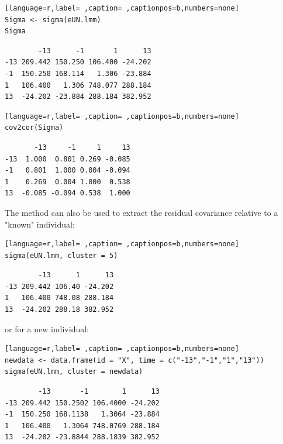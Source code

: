 \documentclass[12pt]{article}
\begin{document}
\medskip

\begin{minipage}{0.45\linewidth}
\begin{lstlisting}[language=r,label= ,caption= ,captionpos=b,numbers=none]
Sigma <- sigma(eUN.lmm)
Sigma
\end{lstlisting}

\begin{verbatim}
        -13      -1       1      13
-13 209.442 150.250 106.400 -24.202
-1  150.250 168.114   1.306 -23.884
1   106.400   1.306 748.077 288.184
13  -24.202 -23.884 288.184 382.952
\end{verbatim}

\end{minipage}
\begin{minipage}{0.05\linewidth}
\hphantom{x}
\end{minipage}
\begin{minipage}{0.45\linewidth}
\begin{lstlisting}[language=r,label= ,caption= ,captionpos=b,numbers=none]
cov2cor(Sigma)
\end{lstlisting}

\begin{verbatim}
       -13     -1     1     13
-13  1.000  0.801 0.269 -0.085
-1   0.801  1.000 0.004 -0.094
1    0.269  0.004 1.000  0.538
13  -0.085 -0.094 0.538  1.000
\end{verbatim}

\end{minipage}

The method can also be used to extract the residual covariance
relative to a "known" individual:
\begin{lstlisting}[language=r,label= ,caption= ,captionpos=b,numbers=none]
sigma(eUN.lmm, cluster = 5)
\end{lstlisting}

\begin{verbatim}
        -13      1      13
-13 209.442 106.40 -24.202
1   106.400 748.08 288.184
13  -24.202 288.18 382.952
\end{verbatim}


or for a new individual:
\begin{lstlisting}[language=r,label= ,caption= ,captionpos=b,numbers=none]
newdata <- data.frame(id = "X", time = c("-13","-1","1","13"))
sigma(eUN.lmm, cluster = newdata)
\end{lstlisting}

\begin{verbatim}
        -13       -1        1      13
-13 209.442 150.2502 106.4000 -24.202
-1  150.250 168.1138   1.3064 -23.884
1   106.400   1.3064 748.0769 288.184
13  -24.202 -23.8844 288.1839 382.952
\end{verbatim}
\end{document}

